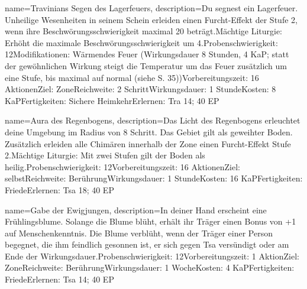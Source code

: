 {
    name={Travinians Segen des Lagerfeuers},
    description={Du segnest ein Lagerfeuer. Unheilige Wesenheiten in seinem Schein erleiden einen Furcht-Effekt der Stufe 2, wenn ihre Beschwörungsschwierigkeit maximal 20 beträgt.\newline Mächtige Liturgie: Erhöht die maximale Beschwörungsschwierigkeit um 4.\newline Probenschwierigkeit: 12\newline Modifikationen: Wärmendes Feuer (Wirkungsdauer 8 Stunden, 4 KaP; statt der gewöhnlichen Wirkung steigt die Temperatur um das Feuer zusätzlich um eine Stufe, bis maximal auf normal (siehe S. 35))\newline Vorbereitungszeit: 16 Aktionen\newline Ziel: Zone\newline Reichweite: 2 Schritt\newline Wirkungsdauer: 1 Stunde\newline Kosten: 8 KaP\newline Fertigkeiten: Sichere Heimkehr\newline Erlernen: Tra 14; 40 EP}
}


{
    name={Aura des Regenbogens},
    description={Das Licht des Regenbogens erleuchtet deine Umgebung im Radius von 8 Schritt. Das Gebiet gilt als geweihter Boden. Zusätzlich erleiden alle Chimären innerhalb der Zone einen Furcht-Effekt Stufe 2.\newline Mächtige Liturgie: Mit zwei Stufen gilt der Boden als heilig.\newline Probenschwierigkeit: 12\newline Vorbereitungszeit: 16 Aktionen\newline Ziel: selbst\newline Reichweite: Berührung\newline Wirkungsdauer: 1 Stunde\newline Kosten: 16 KaP\newline Fertigkeiten: Friede\newline Erlernen: Tsa 18; 40 EP}
}


{
    name={Gabe der Ewigjungen},
    description={In deiner Hand erscheint eine Frühlingsblume. Solange die Blume blüht, erhält ihr Träger einen Bonus von +1 auf Menschenkenntnis. Die Blume verblüht, wenn der Träger einer Person begegnet, die ihm feindlich gesonnen ist, er sich gegen Tsa versündigt oder am Ende der Wirkungsdauer.\newline Probenschwierigkeit: 12\newline Vorbereitungszeit: 1 Aktion\newline Ziel: Zone\newline Reichweite: Berührung\newline Wirkungsdauer: 1 Woche\newline Kosten: 4 KaP\newline Fertigkeiten: Friede\newline Erlernen: Tsa 14; 40 EP}
}


